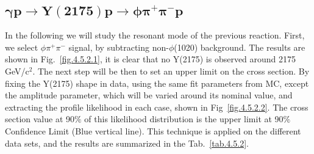 \begin{comment}
Dividing the momentum transfer distribution into 10 equidistant bins, and using a similar method to extract $\phi \pi^+ \pi^-$ signal both in MC and data. We then compute the reconstruction efficiency and the total cross section for different data sets, shown in Fig.~\ref{fig.4.5.1.6}. A stronger dependence of both the efficiency and cross section of the momentum transfer is seen. The cross section difference between the different data sets is similar to the case of the beam energy dependent ones. 

\begin{figure}[H]
    \centering
    \begin{subfigure}[b]{0.45\textwidth}
        \texttt{[image: plots/cmgteff.eps]}
        \caption{}
        \label{fig.4.5.1.6.a}
    \end{subfigure}
    \begin{subfigure}[b]{0.45\textwidth}
        \texttt{[image: plots/cmgtxsec.eps]}
        \caption{}
        \label{fig.4.5.1.6.b}
    \end{subfigure}
    \caption{Proton momentum transfer-dependent reconstruction efficiency (a) and total cross section (b).}
    \label{fig.4.5.1.6}
\end{figure}
\end{comment}

\newpage
\subsection{\texorpdfstring{$\bm{\gamma p \rightarrow Y(2175) p \rightarrow \phi \pi^{+} \pi^{-} p}$}{}}
\label{p.4.5.2}

In the following we will study the resonant mode of the previous reaction. First, we select $\phi \pi^+ \pi^-$ signal, by subtracting non-$\phi$(1020) background. The results are shown in Fig.~\ref{fig.4.5.2.1}, it is clear that no Y(2175) is observed around 2175 GeV/c$^2$. The next step will be then to set an upper limit on the cross section. By fixing the Y(2175) shape in data, using the same fit parameters from MC, except the amplitude parameter, which will be varied around its nominal value, and extracting the profile likelihood in each case, shown in Fig~\ref{fig.4.5.2.2}. The cross section value at 90$\%$ of this likelihood distribution is the upper limit at 90$\%$ Confidence Limit (Blue vertical line). This technique is applied on the different data sets, and the results are summarized in the Tab.~\ref{tab.4.5.2}.

